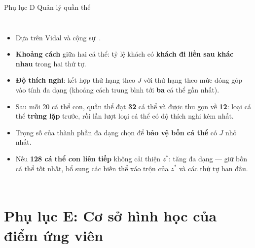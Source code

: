 \documentclass[aspectratio=169,10pt,t,xcolor={table}]{beamer}
\newcommand{\apptitle}[2]{Phụ lục #1 \textperiodcentered{} #2}
\begin{document}
\begin{frame}{\apptitle{D}{Quản lý quần thể}}
\begin{columns}[T,onlytextwidth]
\begin{itemize}\scriptsize
\item Dựa trên Vidal và cộng sự~\cite{vidal2012}.
\item \textbf{Khoảng cách} giữa hai cá thể: tỷ lệ khách có \textbf{khách đi liền sau khác nhau} trong hai thứ tự.
\item \textbf{Độ thích nghi}: kết hợp thứ hạng theo $J$ với thứ hạng theo mức đóng góp vào tính đa dạng (khoảng cách trung bình tới \textbf{ba} cá thể gần nhất).
\item Sau mỗi 20 cá thể con, quần thể đạt \textbf{32} cá thể và được thu gọn về \textbf{12}: loại cá thể \textbf{trùng lặp} trước, rồi lần lượt loại cá thể có độ thích nghi kém nhất.
\item Trọng số của thành phần đa dạng chọn để \textbf{bảo vệ bốn cá thể} có $J$ nhỏ nhất.
\item Nếu \textbf{128 cá thể con liên tiếp} không cải thiện $z^*$: tăng đa dạng --- giữ bốn cá thể tốt nhất, bổ sung các biến thể xáo trộn của $z^*$ và các thứ tự ban đầu.
\end{itemize}
\centering
{}
\end{columns}
\end{frame}
\section{Phụ lục E: Cơ sở hình học của điểm ứng viên}
\end{document}
